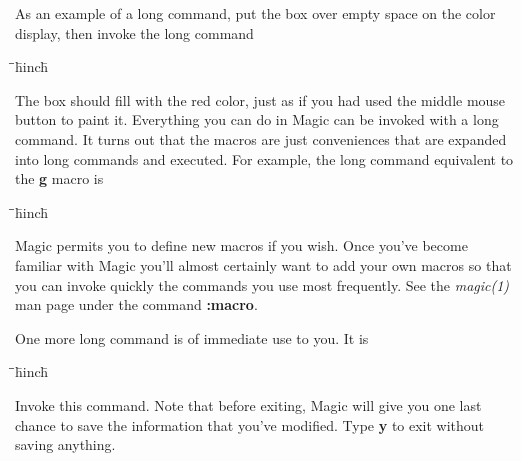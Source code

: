 \documentclass[letterpaper,twoside,12pt]{article}
\def\hinch{\hspace*{0.5in}}
\def\starti{\begin{center}\begin{tabbing}\hinch\=\hinch\=\hinch\=hinch\hinch\=\kill}
\def\endi{\end{tabbing}\end{center}}
\def\ii{\>\>\>}
\begin{document}
As an example of a long command, put the box over empty space on
the color display, then invoke the long command

\starti
   \ii {\bfseries :paint red}
\endi

The box should fill with the red color, just as if you had
used the middle mouse button to paint it.  Everything you can
do in Magic can be invoked with a long command.  It turns out that
the macros are just conveniences that are expanded into long
commands and executed.  For example, the long command equivalent
to the {\bfseries g} macro is

\starti
   \ii {\bfseries :grid}
\endi

Magic permits you to define new macros if you wish.  Once you've
become familiar with Magic you'll almost certainly want to add
your own macros so that you can invoke quickly the commands you
use most frequently.  See the
{\itshape magic(1)} man page under the command {\bfseries :macro}.

One more long command is of immediate use to you.  It is

\starti
   \ii {\bfseries :quit}
\endi

Invoke this command.  Note that before exiting, Magic will
give you one last chance to save the information that you've
modified.  Type {\bfseries y} to exit without saving anything.
\end{document}
